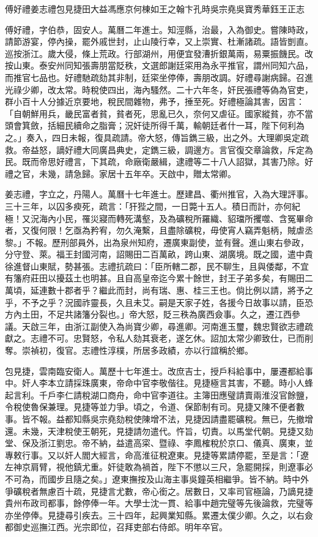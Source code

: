 
\begin{pinyinscope}
傅好禮姜志禮包見捷田大益馮應京何棟如王之翰卞孔時吳宗堯吳寶秀華鈺王正志

傅好禮，字伯恭，固安人。萬曆二年進士。知涇縣，治最，入為御史。嘗陳時政，請節游宴，停內操，罷外戚世封，止山陵行幸，又上崇實、杜漸諸疏。語皆剴直。巡按浙江。歲大侵，條上荒政。行部湖州，用便宜發漕折銀萬兩，易粟振饑民。改按山東。泰安州同知張壽朋當貶秩，文選郎謝廷寀用為永平推官，謂州同知六品，而推官七品也。好禮馳疏劾其非制，廷寀坐停俸，壽朋改調。好禮尋謝病歸。召進光祿少卿，改太常。時稅使四出，海內騷然。二十六年冬，奸民張禮等偽為官吏，群小百十人分據近京要地，稅民間雜物，弗予，捶至死。好禮極論其害，因言：「自朝鮮用兵，畿民富者貧，貧者死，思亂已久，奈何又虐征。國家縱貧，亦不當頭會箕斂，括細民續命之脂膏；況奸徒所得千萬，輸朝廷者什一耳，陛下何利為之。」奏入，四日未報，復具疏請。帝大怒，傳旨鐫三級，出之外。大理卿吳定疏救。帝益怒，謫好禮大同廣昌典史，定鐫三級，調邊方。言官復交章論救，斥定為民。既而帝思好禮言，下其疏，命廠衛嚴緝，逮禮等二十八人詔獄，其害乃除。好禮之官，未幾，請急歸。家居十五年卒。天啟中，贈太常卿。

姜志禮，字立之，丹陽人。萬曆十七年進士。歷建昌、衢州推官，入為大理評事。三十三年，以囚多瘐死，疏言：「犴狴之間，一日斃十五人。積日而計，亦何紀極！又況海內小民，罹災寢而轉死溝壑，及為礦稅所羅織、貂璫所攫噬、含冤畢命者，又復何限！乞亟為矜宥，勿久淹繫，且盡除礦稅，毋使宵人竊弄魁柄，賊虐丞黎。」不報。歷刑部員外，出為泉州知府，遷廣東副使，並有聲。進山東右參政，分守登、萊。福王封國河南，詔賜田二百萬畝，跨山東、湖廣境。既之國，遣中貴徐進督山東賦，勢甚張。志禮抗疏曰：「臣所轄二郡，民不聊生，且與倭鄰，不宜有籓府莊田以擾茲土也明甚。且自高皇帝迄今累十餘世，封王子弟多矣，有賜田二萬頃，延連數十郡者乎？繼此而封，尚有瑞、惠、桂三王也。倘比例以請，將予之乎，不予之乎？況國祚靈長，久且未艾。嗣是天家子姓，各援今日故事以請，臣恐方內土田，不足共諸籓分裂也。」帝大怒，貶三秩為廣西僉事。久之，遷江西參議。天啟三年，由浙江副使入為尚寶少卿，尋進卿。河南進玉璽，魏忠賢欲志禮疏獻之。志禮不可。忠賢怒，令私人劾其衰老，遂乞休。詔加太常少卿致仕，已而削奪。崇禎初，復官。志禮性淳樸，所居多政績，亦以行誼稱於鄉。

包見捷，雲南臨安衛人。萬歷十七年進士。改庶吉士，授戶科給事中，屢遷都給事中。奸人李本立請採珠廣東，帝命中官李敬偕往。見捷極言其害，不聽。時小人蜂起言利。千戶李仁請稅湖口商舟，命中官李道往。主簿田應璧請賣兩淮沒官餘鹽，令稅使魯保兼理。見捷等並力爭。頃之，令道、保節制有司。見捷又陳不便者數事。皆不報。益都知縣吳宗堯劾稅使陳增不法，見捷因請盡罷礦稅。無已，先撤增還。未幾，天津稅使王朝死，見捷請勿遣代。忤旨，切責。以馬堂代朝。見捷又劾堂、保及浙江劉忠。帝不納，益遣高寀、暨祿、李鳳榷稅於京口、儀真、廣東，並專敕行事。又以奸人閻大經言，命高淮征稅遼東。見捷等累請停罷，至是言：「遼左神京肩臂，視他鎮尤重。奸徒敢為禍首，陛下不懲以三尺，急罷開採，則遼事必不可為，而國步且隨之矣。」遼東撫按及山海主事吳鐘英相繼爭。皆不納。時中外爭礦稅者無慮百十疏，見捷言尤數，帝心銜之。居數日，又率司官極論，乃謫見捷貴州布政司都事，餘停俸一年。大學士沈一貫、給事中趙完璧等先後論救，完璧等亦坐停俸。見捷尋引疾去。三十四年，起興業知縣。累遷太僕少卿。久之，以右僉都御史巡撫江西。光宗即位，召拜吏部右侍郎。明年卒官。


\end{pinyinscope}

